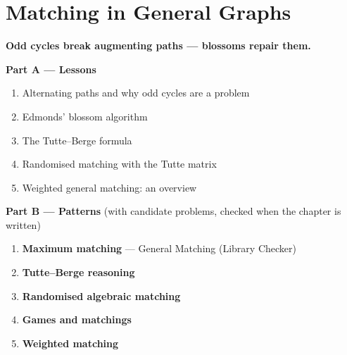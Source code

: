 \chapter{Matching in General Graphs}
\label{ch:general_matching}

\begin{tcolorbox}[enhanced, colback=white, colframe=secondaryblue, boxrule=1pt, arc=2mm]
\textbf{\large\textcolor{primaryblue}{Odd cycles break augmenting paths --- blossoms repair them.}}
\end{tcolorbox}


\begin{plannedbox}
\textbf{Part A --- Lessons}
\begin{enumerate}[leftmargin=*, label=\textbf{A\arabic*.}, itemsep=1pt]
    \item Alternating paths and why odd cycles are a problem
    \item Edmonds' blossom algorithm
    \item The Tutte--Berge formula
    \item Randomised matching with the Tutte matrix
    \item Weighted general matching: an overview
\end{enumerate}
\textbf{Part B --- Patterns} (with candidate problems, checked when the chapter is written)
\begin{enumerate}[leftmargin=*, label=\textbf{P\arabic*.}, itemsep=1pt]
    \item \textbf{Maximum matching} --- General Matching {\small\color{darkgray}(Library Checker)}
    \item \textbf{Tutte--Berge reasoning}
    \item \textbf{Randomised algebraic matching}
    \item \textbf{Games and matchings}
    \item \textbf{Weighted matching}
\end{enumerate}
\end{plannedbox}
